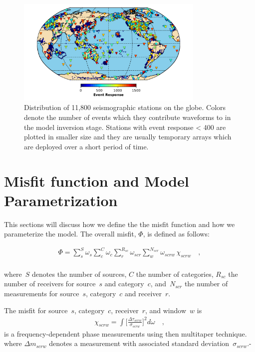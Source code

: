 \documentclass[extra,mreferee]{gji}
\begin{document}
\begin{figure}
  \includegraphics[width=0.8\textwidth]{figures/station_map.pdf}
  \caption{Distribution of 11,800 seismographic stations on the globe. Colors denote the number of events which they contribute waveforms to in the model inversion stage. Stations with event response < 400 are plotted in smaller size and they are usually temporary arrays which are deployed over a short period of time.}
  \label{fig:stations}
  \centering
\end{figure}

\section{Misfit function and Model Parametrization}

This sections will discuss how we define the the misfit function and how we parameterize the model.
The overall misfit, $\Phi$, is defined as follows:

\begin{align}
\label{eq:misfit}
\Phi = \sum_{s}^{S} \omega_s \sum_{c}^{C} \omega_{c} \sum_{r}^{R_{sc}} \omega_{scr} \sum_{w}^{N_{scr}} \omega_{scrw}\, \chi_{scrw}
\quad ,
\end{align}\\
where~$S$ denotes the number of sources, $C$ the number of categories,
$R_{sc}$ the number of receivers for source~$s$ and category~$c$,
and~$N_{scr}$ the number of measurements for source~$s$, category~$c$
and receiver~$r$.

The misfit for source~$s$, category~$c$, receiver~$r$, and window~$w$ is
\begin{align}
  \chi_{scrw} = \int \Big[ \frac {\Delta \tau_{scrw}} {\sigma_{scrw}} \Big]^2 d\omega
\quad ,
\end{align}
is a frequency-dependent phase measurements using then multitaper technique.
where $\Delta m_{scrw}$ denotes a measurement with associated standard deviation~$\sigma_{scrw}$.-
\end{document}

